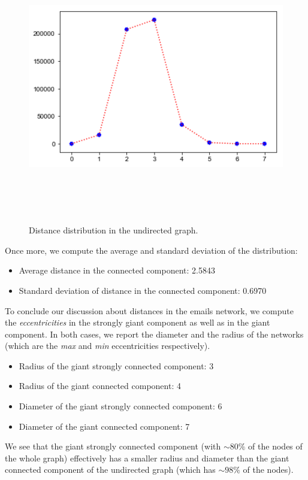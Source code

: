 \documentclass{report}
\theoremstyle{definition}
\theoremstyle{remark}
\begin{document}
\begin{figure} [H]
	\centering
	\centerline{\includegraphics[width = 13cm, height = 12cm, keepaspectratio]{distance_distribution_und.png}}
	\label{Dist_und}
	\caption{Distance distribution in the undirected graph.}
\end{figure}
Once more, we compute the average and standard deviation of the distribution:
 \begin{itemize}
	\item Average distance in the connected component: 2.5843
	\item Standard deviation of distance in the connected component: 0.6970
\end{itemize}
To conclude our discussion about distances in the emails network, we compute the \textit{eccentricities} in the strongly giant component as well as in the giant component. In both cases, we report the diameter and the radius of the networks (which are the \textit{max} and \textit{min} eccentricities respectively).
\begin{itemize}
	\item Radius of the giant strongly connected component: 3
	\item Radius of the giant connected component: 4
	\item Diameter of the giant strongly connected component: 6
	\item Diameter of the giant connected component: 7
\end{itemize}
We see that the giant strongly connected component (with $\sim80\%$ of the nodes of the whole graph) effectively has a smaller radius and diameter than the giant connected component of the undirected graph (which has $\sim98\%$ of the nodes).
\end{document}

